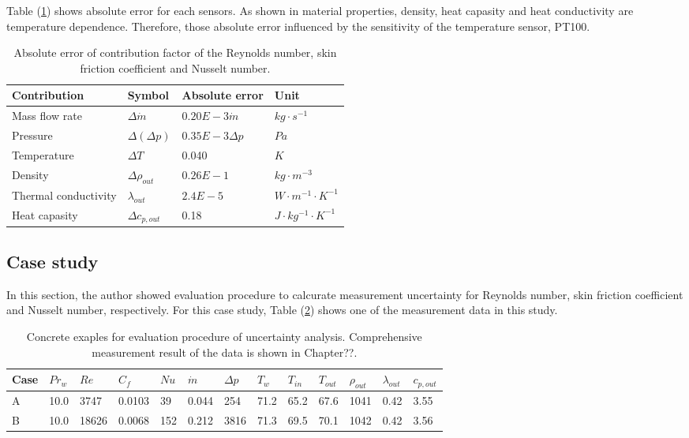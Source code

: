 \documentclass[12pt,oneside]{jbook}
\begin{document}
Table (\ref{absolute_error}) shows absolute error for each sensors.
As shown in material properties, density, heat capasity and heat conductivity are temperature dependence.
Therefore, those absolute error influenced by the sensitivity of the temperature sensor, PT100.
\begin{table}[h]
\centering
\caption{Absolute error of contribution factor of the Reynolds number, skin friction coefficient and Nusselt number.}
\vspace{1zh}
\label{absolute_error}
\begin{tabular}{llll} \toprule%
{Contribution} & {Symbol}          & {Absolute error}   & {Unit}\\ \midrule
Mass flow rate & $\Delta \dot{m}$  & $0.20E-3\dot{m}$   & $kg\cdot s^{-1}$\\
Pressure       & $\Delta(\Delta p)$& $0.35E-3\Delta p$  & $Pa$\\
Temperature    & $\Delta T$        & 0.040              & $K$\\
Density        & $\Delta \rho_{out}$& $0.26E-1$         & $kg\cdot m^{-3}$\\
Thermal conductivity & $\lambda_{out}$& $2.4E-5$        & $W\cdot m^{-1}\cdot K^{-1}$\\
Heat capasity  & $\Delta c_{p,out}$& 0.18               & $J\cdot kg^{-1}\cdot K^{-1}$\\
\bottomrule
\end{tabular}
\end{table}

\clearpage
\subsection{Case study}
In this section, the author showed evaluation procedure to calcurate measurement uncertainty for Reynolds number, skin friction coefficient and Nusselt number, respectively.
For this case study, Table (\ref{case_study}) shows one of the measurement data in this study.

\begin{table}[h]
\centering
\caption{Concrete exaples for evaluation procedure of uncertainty analysis. Comprehensive measurement result of the data is shown in Chapter??.}
\vspace{1zh}
\label{case_study}
\begin{tabular}{lllllllllllll} \toprule%
{Case} & {$Pr_{w}$} & {$Re$}  & {$C_{f}$} & {$Nu$} & {$\dot{m}$} & {$\Delta p$} & {$T_{w}$} & {$T_{in}$} & {$T_{out}$} & {$\rho_{out}$} & {$\lambda_{out}$} & $c_{p,out}$\\ \midrule
A & 10.0 & 3747 & 0.0103 & 39  & 0.044 & 254  & 71.2 & 65.2 & 67.6 & 1041 & 0.42 & 3.55\\
B & 10.0 & 18626& 0.0068 & 152 & 0.212 & 3816 & 71.3 & 69.5 &70.1&
1042 & 0.42 & 3.56\\
\bottomrule
\end{tabular}
\end{table}
\end{document}
